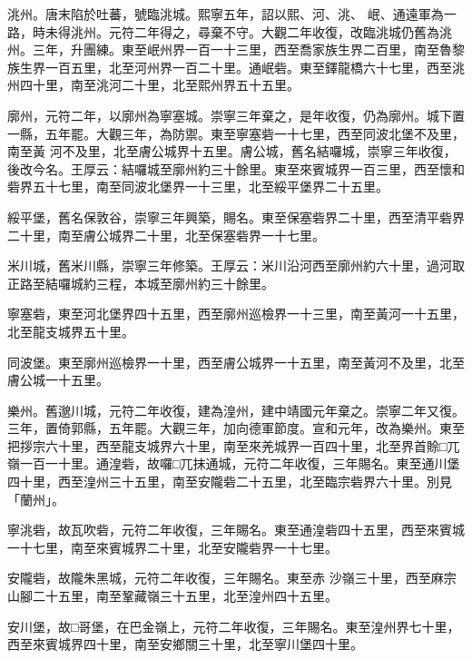 \begin{pinyinscope}
 洮州。唐末陷於吐蕃，號臨洮城。熙寧五年，詔以熙、河、洮、
 岷、通遠軍為一路，時未得洮州。元符二年得之，尋棄不守。大觀二年收復，改臨洮城仍舊為洮州。三年，升團練。東至岷州界一百一十三里，西至喬家族生界二百里，南至魯黎族生界一百五里，北至河州界一百二十里。通岷砦。東至鐸龍橋六十七里，西至洮州四十里，南至洮河二十里，北至熙州界五十五里。



 廓州，元符二年，以廓州為寧塞城。崇寧三年棄之，是年收復，仍為廓州。城下置一縣，五年罷。大觀三年，為防禦。東至寧塞砦一十七里，西至同波北堡不及里，南至黃
 河不及里，北至膚公城界十五里。膚公城，舊名結囉城，崇寧三年收復，後改今名。王厚云：結囉城至廓州約三十餘里。東至來賓城界一百三里，西至懷和砦界五十七里，南至同波北堡界一十三里，北至綏平堡界二十五里。



 綏平堡，舊名保敦谷，崇寧三年興築，賜名。東至保塞砦界二十里，西至清平砦界二十里，南至膚公城界二十里，北至保塞砦界一十七里。



 米川城，舊米川縣，崇寧三年修築。王厚云：米川沿河西至廓州約六十里，過河取正路至結囉城約三程，本城至廓州約三十餘里。



 寧塞砦，東至河北堡界四十五里，西至廓州巡檢界一十三里，南至黃河一十五里，北至龍支城界五十里。



 同波堡。東至廓州巡檢界一十里，西至膚公城界一十五里，南至黃河不及里，北至膚公城一十五里。



 樂州。舊邈川城，元符二年收復，建為湟州，建中靖國元年棄之。崇寧二年又復。三年，置倚郭縣，五年罷。大觀三年，加向德軍節度。宣和元年，改為樂州。東至把拶宗六十里，西至龍支城界六十里，南至來羌城界一百四十里，北至界首賒□兀嶺一百一十里。通湟砦，故囉□兀抹通城，元符二年收復，三年賜名。東至通川堡四十里，西至湟州三十五里，南至安隴砦二十五里，北至臨宗砦界六十里。別見「蘭州」。



 寧洮砦，故瓦吹砦，元符二年收復，三年賜名。東至通湟砦四十五里，西至來賓城一十七里，南至來賓城界二十里，北至安隴砦界一十七里。



 安隴砦，故隴朱黑城，元符二年收復，三年賜名。東至赤
 沙嶺三十里，西至麻宗山腳二十五里，南至鞏藏嶺三十五里，北至湟州四十五里。



 安川堡，故□哥堡，在巴金嶺上，元符二年收復，三年賜名。東至湟州界七十里，西至來賓城界四十里，南至安鄉關三十里，北至寧川堡四十里。




\end{pinyinscope}
